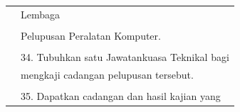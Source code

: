 \documentclass[
]{article}
\begin{document}
\begin{longtable}[]{@{}ll@{}}
\begin{minipage}[t]{0.23\columnwidth}
\strut
\end{minipage} & \begin{minipage}[t]{0.71\columnwidth}\raggedright
Lembaga\strut
\end{minipage}\tabularnewline
\begin{minipage}[t]{0.23\columnwidth}\raggedright
\strut
\end{minipage} & \begin{minipage}[t]{0.71\columnwidth}\raggedright
\strut
\end{minipage}\tabularnewline
\begin{minipage}[t]{0.23\columnwidth}\raggedright
\strut
\end{minipage} & \begin{minipage}[t]{0.71\columnwidth}\raggedright
Pelupusan Peralatan Komputer.\strut
\end{minipage}\tabularnewline
\begin{minipage}[t]{0.23\columnwidth}\raggedright
\strut
\end{minipage} & \begin{minipage}[t]{0.71\columnwidth}\raggedright
\strut
\end{minipage}\tabularnewline
\begin{minipage}[t]{0.23\columnwidth}\raggedright
\strut
\end{minipage} & \begin{minipage}[t]{0.71\columnwidth}\raggedright
34. Tubuhkan satu Jawatankuasa Teknikal bagi\strut
\end{minipage}\tabularnewline
\begin{minipage}[t]{0.23\columnwidth}\raggedright
\strut
\end{minipage} & \begin{minipage}[t]{0.71\columnwidth}\raggedright
mengkaji cadangan pelupusan tersebut.\strut
\end{minipage}\tabularnewline
\begin{minipage}[t]{0.23\columnwidth}\raggedright
\strut
\end{minipage} & \begin{minipage}[t]{0.71\columnwidth}\raggedright
\strut
\end{minipage}\tabularnewline
\begin{minipage}[t]{0.23\columnwidth}\raggedright
\strut
\end{minipage} & \begin{minipage}[t]{0.71\columnwidth}\raggedright
35. Dapatkan cadangan dan hasil kajian yang\strut
\end{minipage}\tabularnewline

\end{longtable}
\end{document}
